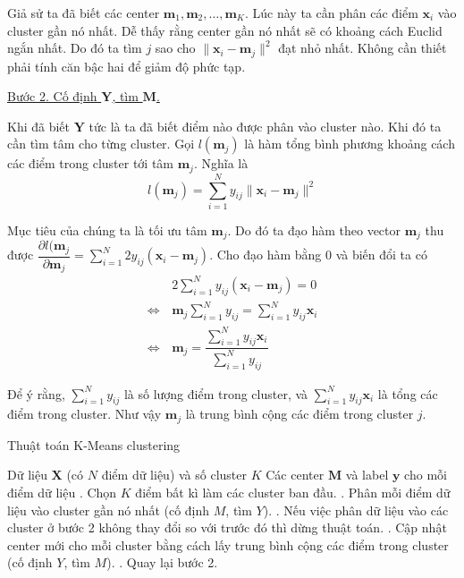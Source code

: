 Giả sử ta đã biết các center $\bm{m}_1, \bm{m}_2, \ldots, \bm{m}_K$. Lúc này ta cần phân các điểm $\bm{x}_i$ vào cluster gần nó nhất. Dễ thấy rằng center gần nó nhất sẽ có khoảng cách Euclid ngắn nhất. Do đó ta tìm $j$ sao cho $\lVert \bm{x}_i - \bm{m}_j \rVert^2$ đạt nhỏ nhất. Không cần thiết phải tính căn bậc hai để giảm độ phức tạp.

\underline{Bước 2. Cố định $\bm{Y}$, tìm $\bm{M}$.}

Khi đã biết $\bm{Y}$ tức là ta đã biết điểm nào được phân vào cluster nào. Khi đó ta cần tìm tâm cho từng cluster. Gọi $l (\bm{m}_j)$ là hàm tổng bình phương khoảng cách các điểm trong cluster tới tâm $\bm{m}_j$. Nghĩa là \[ l (\bm{m}_j) = \sum_{i=1}^N y_{ij} \lVert \bm{x}_i - \bm{m}_j \rVert^2 \]

Mục tiêu của chúng ta là tối ưu tâm $\bm{m}_j$. Do đó ta đạo hàm theo vector $\bm{m}_j$ thu được $\dfrac{\partial l(\bm{m}_j}{\partial \bm{m}_j} = \sum_{i=1}^N 2 y_{ij} (\bm{x}_i - \bm{m}_j)$. Cho đạo hàm bằng 0 và biến đổi ta có \begin{align*}
    & 2 \sum_{i=1}^N y_{ij} (\bm{x}_i - \bm{m}_j) = 0 \\ \Leftrightarrow \, & \bm{m}_j \sum_{i=1}^N y_{ij} = \sum_{i=1}^N y_{ij} \bm{x}_i \\ \Leftrightarrow \, & \bm{m}_j = \dfrac{\sum_{i=1}^N y_{ij} \bm{x}_i}{\sum_{i=1}^N y_{ij}}
\end{align*}

Để ý rằng, $\sum_{i=1}^N y_{ij}$ là số lượng điểm trong cluster, và $\sum_{i=1}^N y_{ij} \bm{x}_i$ là tổng các điểm trong cluster. Như vậy $\bm{m}_j$ là trung bình cộng các điểm trong cluster $j$.

\begin{algorithm}
    \caption{Thuật toán K-Means clustering}
    \begin{algorithmic}
        \Require Dữ liệu $\bm{X}$ (có $N$ điểm dữ liệu) và số cluster $K$
        \Ensure Các center $\bm{M}$ và label $\bm{y}$ cho mỗi điểm dữ liệu
        . Chọn $K$ điểm bất kì làm các cluster ban đầu.
        . Phân mỗi điểm dữ liệu vào cluster gần nó nhất (cố định $M$, tìm $Y$).
        . Nếu việc phân dữ liệu vào các cluster ở bước 2 không thay đổi so với trước đó thì dừng thuật toán.
        . Cập nhật center mới cho mỗi cluster bằng cách lấy trung bình cộng các điểm trong cluster (cố định $Y$, tìm $M$).
        . Quay lại bước 2.
    \end{algorithmic}
\end{algorithm}

